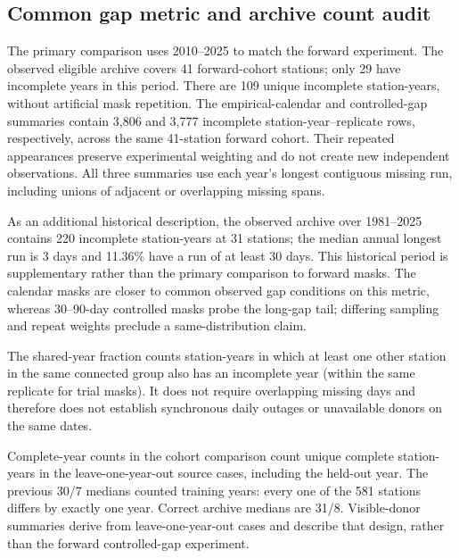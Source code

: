\subsection{Common gap metric and archive count audit}

The primary comparison uses 2010--2025 to match the forward experiment. The observed eligible archive covers 41 forward-cohort stations; only 29 have incomplete years in this period. There are 109 unique incomplete station-years, without artificial mask repetition. The empirical-calendar and controlled-gap summaries contain 3,806 and 3,777 incomplete station-year--replicate rows, respectively, across the same 41-station forward cohort. Their repeated appearances preserve experimental weighting and do not create new independent observations. All three summaries use each year's longest contiguous missing run, including unions of adjacent or overlapping missing spans.

As an additional historical description, the observed archive over 1981--2025 contains 220 incomplete station-years at 31 stations; the median annual longest run is 3 days and 11.36\% have a run of at least 30 days. This historical period is supplementary rather than the primary comparison to forward masks. The calendar masks are closer to common observed gap conditions on this metric, whereas 30--90-day controlled masks probe the long-gap tail; differing sampling and repeat weights preclude a same-distribution claim.

The shared-year fraction counts station-years in which at least one other station in the same connected group also has an incomplete year (within the same replicate for trial masks). It does not require overlapping missing days and therefore does not establish synchronous daily outages or unavailable donors on the same dates.

Complete-year counts in the cohort comparison count unique complete station-years in the leave-one-year-out source cases, including the held-out year. The previous 30/7 medians counted training years: every one of the 581 stations differs by exactly one year. Correct archive medians are 31/8. Visible-donor summaries derive from leave-one-year-out cases and describe that design, rather than the forward controlled-gap experiment.
